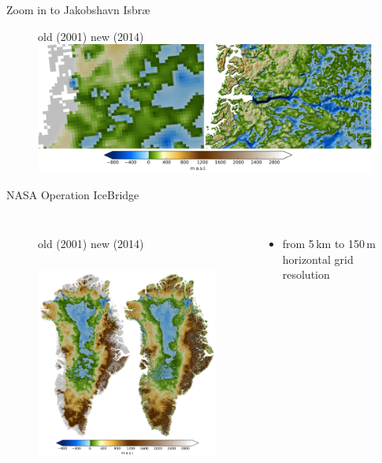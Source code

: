 \documentclass[hide notes,intlimits,unknownkeysallowed]{beamer}
\begin{document}
\begin{frame}{Zoom in to Jakobshavn Isbr{\ae}}
  \begin{figure}
    \small{old (2001) \hspace{5em} new (2014)}
    \includegraphics[width=12cm]{jako_bed}
 \end{figure}
\end{frame}


\begin{frame}{NASA Operation IceBridge}
  \begin{columns}
    \column[c]{8cm}
    \begin{figure}
      \small{old (2001) \hspace{4em} new (2014)}
      \includegraphics[height=7.5cm]{greenland_bed}
    \end{figure}
    \column[c]{4cm}
    \begin{itemize}
    \item from 5\,km to 150\,m horizontal grid resolution
    \end{itemize}
  \end{columns}
\end{frame}
\end{document}
